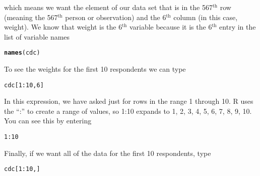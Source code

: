 \documentclass{article}\usepackage[]{graphicx}\usepackage[]{color}
\makeatletter
\newcommand{\hlnum}[1]{\textcolor[rgb]{0.686,0.059,0.569}{#1}}%
\newcommand{\hlopt}[1]{\textcolor[rgb]{0,0,0}{#1}}%
\newcommand{\hlstd}[1]{\textcolor[rgb]{0.345,0.345,0.345}{#1}}%
\newcommand{\hlkwd}[1]{\textcolor[rgb]{0.737,0.353,0.396}{\textbf{#1}}}%
\newenvironment{kframe}{%
 \def\at@end@of@kframe{}%
 \ifinner\ifhmode%
  \def\at@end@of@kframe{\end{minipage}}%
  \begin{minipage}{\columnwidth}%
 \fi\fi%
 \def\FrameCommand##1{\hskip\@totalleftmargin \hskip-\fboxsep
 \colorbox{shadecolor}{##1}\hskip-\fboxsep
     \hskip-\linewidth \hskip-\@totalleftmargin \hskip\columnwidth}%
 \MakeFramed {\advance\hsize-\width
   \@totalleftmargin\z@ \linewidth\hsize
   \@setminipage}}%
 {\par\unskip\endMakeFramed%
 \at@end@of@kframe}
\newenvironment{knitrout}{}{} %
\makeatother
\begin{document}
which means we want the element of our data set that is in the 567$^{\textrm{th}}$ row (meaning the 567$^{\textrm{th}}$ person or observation) and the 6$^{\textrm{th}}$ column (in this case, weight). We know that \hlstd{weight} is the 6$^{\textrm{th}}$ variable because it is the 6$^{\textrm{th}}$ entry in the list of variable names

\begin{knitrout}
\color{fgcolor}\begin{kframe}
\begin{alltt}
\hlkwd{names}\hlstd{(cdc)}
\end{alltt}
\end{kframe}
\end{knitrout}

To see the weights for the first 10 respondents we can type

\begin{knitrout}
\color{fgcolor}\begin{kframe}
\begin{alltt}
\hlstd{cdc[}\hlnum{1}\hlopt{:}\hlnum{10}\hlstd{,}\hlnum{6}\hlstd{]}
\end{alltt}
\end{kframe}
\end{knitrout}

In this expression, we have asked just for rows in the range 1 through 10.  R uses the ``:'' to create a range of values, so 1:10 expands to 1, 2, 3, 4, 5, 6, 7, 8, 9, 10. You can see this by entering

\begin{knitrout}
\color{fgcolor}\begin{kframe}
\begin{alltt}
\hlnum{1}\hlopt{:}\hlnum{10}
\end{alltt}
\end{kframe}
\end{knitrout}

Finally, if we want all of the data for the first 10 respondents, type

\begin{knitrout}
\color{fgcolor}\begin{kframe}
\begin{alltt}
\hlstd{cdc[}\hlnum{1}\hlopt{:}\hlnum{10}\hlstd{,]}
\end{alltt}
\end{kframe}
\end{knitrout}
\end{document}
